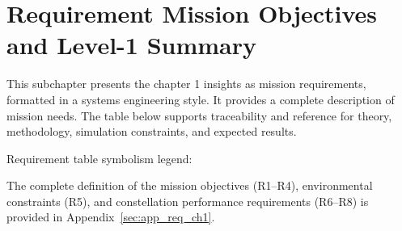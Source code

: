 \section{Requirement Mission Objectives and Level-1 Summary}\label{sec:requirements_level1}

This subchapter presents the chapter 1 insights as mission requirements, formatted in a systems engineering style. It provides a complete description of mission needs. The table below supports traceability and reference for theory, methodology, simulation constraints, and expected results.

\vspace{\baselineskip}
Requirement table symbolism legend:
\vspace{\baselineskip}

\vspace{\baselineskip}


\vspace{\baselineskip}
The complete definition of the mission objectives (R1--R4), environmental constraints (R5), and constellation performance requirements (R6--R8) is provided in Appendix~\ref{sec:app_req_ch1}.
